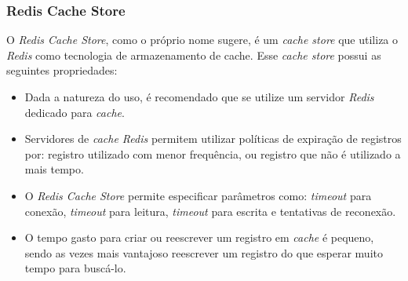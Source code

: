 \subsubsection{Redis Cache Store}

O \textit{Redis Cache Store}, como o próprio nome sugere, é um \textit{cache store} que utiliza o \textit{Redis} como tecnologia de armazenamento de cache. Esse \textit{cache store} possui as seguintes propriedades:

\begin{itemize}
    \item Dada a natureza do uso, é recomendado que se utilize um servidor \textit{Redis} dedicado para \textit{cache}.
    \item Servidores de \textit{cache Redis} permitem utilizar políticas de expiração de registros por: registro utilizado com menor frequência, ou registro que não é utilizado a mais tempo.
    \item O \textit{Redis Cache Store} permite especificar parâmetros como: \textit{timeout} para conexão, \textit{timeout} para leitura, \textit{timeout} para escrita e tentativas de reconexão.
    \item O tempo gasto para criar ou reescrever um registro em \textit{cache} é pequeno, sendo as vezes mais vantajoso reescrever um registro do que esperar muito tempo para buscá-lo.
\end{itemize}